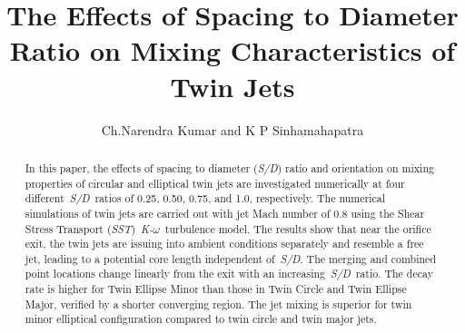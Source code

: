 \documentclass[Afour,sagev,times]{sagej}
\begin{document}

\title{The Effects of Spacing to Diameter Ratio on Mixing Characteristics of Twin Jets}

\author{Ch.Narendra Kumar and K P Sinhamahapatra }




\begin{abstract}
In this paper, the effects of spacing to diameter (\textit{S/D}) ratio and orientation on mixing properties of circular and elliptical twin jets are investigated numerically at four different~\textit{S/D}~ratios of 0.25, 0.50, 0.75, and 1.0, respectively. The numerical simulations of twin jets are carried out with jet Mach number of 0.8 using the Shear Stress Transport (\textit{SST})~\textit{K-$\omega$}~turbulence model. The results show that near the orifice exit, the twin jets are issuing into ambient conditions separately and resemble a free jet, leading to a potential core length independent of~\textit{S/D}. The merging and combined point locations change linearly from the exit with an increasing~\textit{S/D}~ratio. The decay rate is higher for Twin Ellipse Minor than those in Twin Circle and Twin Ellipse Major, verified by a shorter converging region. The jet mixing is superior for twin minor elliptical configuration compared to twin circle and twin major jets.
\end{abstract}

\maketitle
\end{document}
